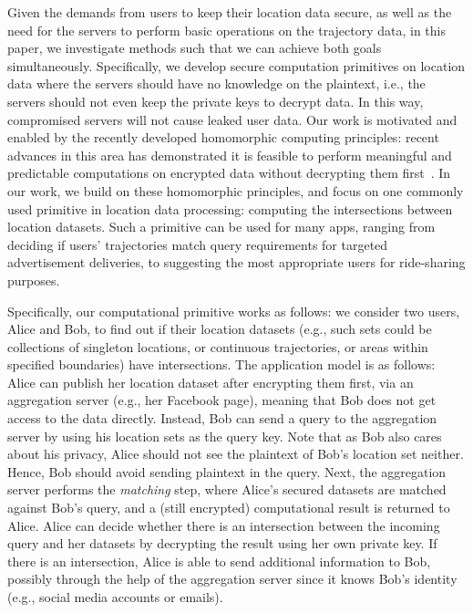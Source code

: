 Given the demands from users to keep their location data secure, as well as the need for the servers to perform basic operations on the trajectory data, in this paper, we investigate methods such that we can achieve both goals simultaneously. Specifically, we develop secure computation primitives on location data where the servers should have no knowledge on the plaintext, i.e., the servers should not even keep the private keys to decrypt data. In this way, compromised servers will not cause leaked user data. Our work is motivated and enabled by the recently developed homomorphic computing principles: recent advances in this area has demonstrated it is feasible to perform meaningful and predictable computations on encrypted data without decrypting them first~\cite{Gentry:2009:FHE:1536414.1536440,ahn2015computing}. In our work, we build on these homomorphic principles, and focus on one commonly used primitive in location data processing: computing the intersections between location datasets. Such a primitive can be used for many apps, ranging from deciding if users' trajectories match query requirements for targeted advertisement deliveries, to suggesting the most appropriate users for ride-sharing purposes.

Specifically, our computational primitive works as follows: we consider two users, Alice and Bob, to find out if their location datasets (e.g., such sets could be collections of singleton locations, or continuous trajectories, or areas within specified boundaries) have intersections. The application model is as follows: Alice can publish her location dataset after encrypting them first, via an aggregation server (e.g., her Facebook page), meaning that Bob does not get access to the data directly. Instead, Bob can send a query to the aggregation server by using his location sets as the query key. Note that as Bob also cares about his privacy, Alice should not see the plaintext of Bob’s location set neither. Hence, Bob should avoid sending plaintext in the query. Next, the aggregation server performs the \emph{matching} step, where Alice's secured datasets are matched against Bob's query, and a (still encrypted) computational result is returned to Alice. Alice can decide whether there is an intersection between the incoming query and her datasets by decrypting the result using her own private key. If there is an intersection, Alice is able to send additional information to Bob, possibly through the help of the aggregation server since it knows Bob's identity (e.g., social media accounts or emails).

